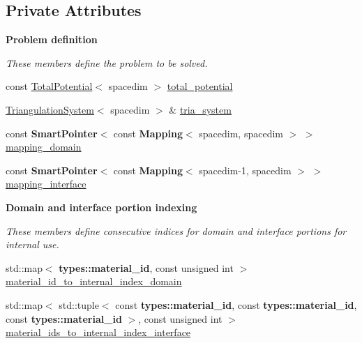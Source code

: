 \subsection*{Private Attributes}
\begin{Indent}{\bf Problem definition}\par
{\em These members define the problem to be solved. }\begin{DoxyCompactItemize}
\item 
const \hyperlink{class_total_potential}{Total\+Potential}$<$ spacedim $>$ \hyperlink{class_assembly_helper_a748eed9d73b7437a4bf2dcd73108790b}{total\+\_\+potential}
\item 
\hyperlink{class_triangulation_system}{Triangulation\+System}$<$ spacedim $>$ \& \hyperlink{class_assembly_helper_add08a8a7bb9c9325fcc7d92bfce525d4}{tria\+\_\+system}
\item 
const {\bf Smart\+Pointer}$<$ const {\bf Mapping}$<$ spacedim, spacedim $>$ $>$ \hyperlink{class_assembly_helper_a3fbb49461000dea8f64266f830709fad}{mapping\+\_\+domain}
\item 
const {\bf Smart\+Pointer}$<$ const {\bf Mapping}$<$ spacedim-\/1, spacedim $>$ $>$ \hyperlink{class_assembly_helper_a055fde6217c18e62cd80188d0130c201}{mapping\+\_\+interface}
\end{DoxyCompactItemize}
\end{Indent}
\begin{Indent}{\bf Domain and interface portion indexing}\par
{\em These members define consecutive indices for domain and interface portions for internal use. }\begin{DoxyCompactItemize}
\item 
std\+::map$<$ {\bf types\+::material\+\_\+id}, const unsigned int $>$ \hyperlink{class_assembly_helper_a10b3acf64bccc169ee14dc2505ce4b46}{material\+\_\+id\+\_\+to\+\_\+internal\+\_\+index\+\_\+domain}
\item 
std\+::map$<$ std\+::tuple$<$ const {\bf types\+::material\+\_\+id}, const {\bf types\+::material\+\_\+id}, const {\bf types\+::material\+\_\+id} $>$, const unsigned int $>$ \hyperlink{class_assembly_helper_a43b82de0ede96d03b9f7fd8740d81668}{material\+\_\+ids\+\_\+to\+\_\+internal\+\_\+index\+\_\+interface}
\end{DoxyCompactItemize}
\end{Indent}

